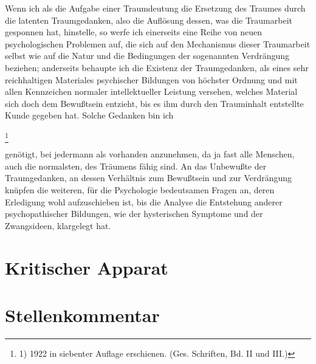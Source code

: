 \documentclass[twoside=true,titlepage=false,open=any, parskip=never, fontsize=10pt, headings=small, chapterprefix=false, appendixprefix=false]{scrbook}
\begin{document}
            
        \pstart
        Wenn ich als die Aufgabe einer Traumdeutung die Ersetzung des Traumes durch die
               latenten Traumgedanken, also die Auflösung dessen, was die
               Traumarbeit gesponnen hat, hinstelle, so werfe ich einerseits eine Reihe von
               neuen psychologischen Problemen auf, die sich auf den Mechanismus
               dieser Traumarbeit selbst wie auf die Natur und die Bedingungen der
               sogenannten Verdrängung beziehen; anderseits behaupte ich die Existenz der
               Traumgedanken, als eines sehr reichhaltigen Materiales psychischer Bildungen von
               höchster Ordnung und mit allen Kennzeichen normaler intellektueller Leistung
               versehen, welches Material sich doch dem Bewußtsein entzieht, bis es ihm durch
               den Trauminhalt entstellte Kunde gegeben hat. Solche Gedanken bin
               ich
        \pend
    
            
        \footnote{1) 1922 in siebenter Auflage
               erschienen. (Ges. Schriften, Bd. II und III.)}
    
         
            
            
            
        \pstart
        genötigt, bei jedermann als vorhanden anzunehmen, da ja fast alle
               Menschen, auch die normalsten, des Träumens fähig sind. An das Unbewußte der
               Traumgedanken, an dessen Verhältnis zum Bewußtsein und zur Verdrängung knüpfen
               die weiteren, für die Psychologie bedeutsamen Fragen an, deren Erledigung
               wohl aufzuschieben ist, bis die Analyse die Entstehung anderer psychopathischer Bildungen, wie der hysterischen Symptome und der
               Zwangsideen, klargelegt hat.
        \pend
    
         
        \endnumbering
  
        \section*{Kritischer Apparat}
        
        \section*{Stellenkommentar}
        
        \printindex[person]
        \printindex[kw]
        


        
\end{document}
